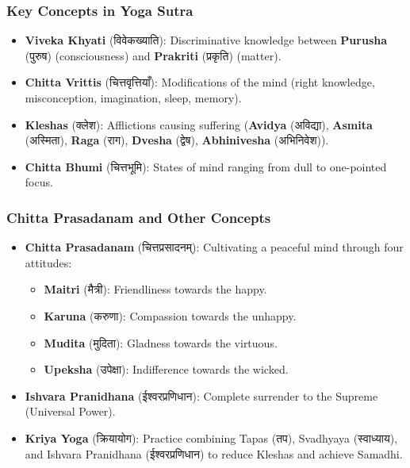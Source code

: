 \begin{frame}[fragile]\frametitle{Key Concepts in Yoga Sutra}
    \begin{itemize}
        \item \textbf{Viveka Khyati} (विवेकख्याति): Discriminative knowledge between \textbf{Purusha} (पुरुष) (consciousness) and \textbf{Prakriti} (प्रकृति) (matter).
        \item \textbf{Chitta Vrittis} (चित्तवृत्तियाँ): Modifications of the mind (right knowledge, misconception, imagination, sleep, memory).
        \item \textbf{Kleshas} (क्लेश): Afflictions causing suffering (\textbf{Avidya} (अविद्या), \textbf{Asmita} (अस्मिता), \textbf{Raga} (राग), \textbf{Dvesha} (द्वेष), \textbf{Abhinivesha} (अभिनिवेश)).
        \item \textbf{Chitta Bhumi} (चित्तभूमि): States of mind ranging from dull to one-pointed focus.
    \end{itemize}
\end{frame}

\begin{frame}[fragile]\frametitle{Chitta Prasadanam and Other Concepts}
    \begin{itemize}
        \item \textbf{Chitta Prasadanam} (चित्तप्रसादनम्): Cultivating a peaceful mind through four attitudes:
        \begin{itemize}
            \item \textbf{Maitri} (मैत्री): Friendliness towards the happy.
            \item \textbf{Karuna} (करुणा): Compassion towards the unhappy.
            \item \textbf{Mudita} (मुदिता): Gladness towards the virtuous.
            \item \textbf{Upeksha} (उपेक्षा): Indifference towards the wicked.
        \end{itemize}
        \item \textbf{Ishvara Pranidhana} (ईश्वरप्रणिधान): Complete surrender to the Supreme (Universal Power).
        \item \textbf{Kriya Yoga} (क्रियायोग): Practice combining Tapas (तप), Svadhyaya (स्वाध्याय), and Ishvara Pranidhana (ईश्वरप्रणिधान) to reduce Kleshas and achieve Samadhi.
    \end{itemize}
\end{frame}


